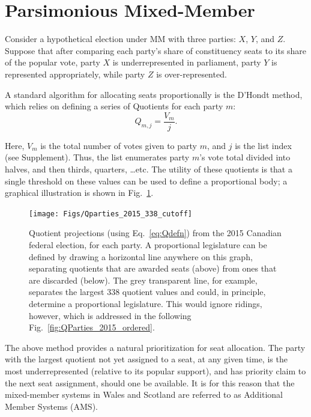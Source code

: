 \section{Parsimonious Mixed-Member}
\label{sec:model_proposal}

Consider a hypothetical election under MM with three parties: $X$, $Y$, and $Z$. Suppose that after comparing each party's share of constituency seats to its share of the popular vote, party $X$ is underrepresented in parliament, party $Y$ is represented appropriately, while party $Z$ is over-represented. 

A standard algorithm for allocating seats proportionally is the D'Hondt method, which relies on defining a series of Quotients for each party $m$:
\begin{equation}
\label{eq:Qdefn}
Q_{m,j} = \frac{V_m}{j}.
\end{equation}

Here, $V_m$ is the total number of votes given to party $m$, and $j$ is the list index (see Supplement). 
Thus, the list enumerates party $m$'s vote total divided into halves, and then thirds, quarters, \ldots etc. The utility of these quotients is that a single threshold on these values can be used to define a proportional body; a graphical illustration is shown in Fig.~\ref{fig:Qparties_2015_338_cutoff}. 


\begin{figure} %
  \texttt{[image: Figs/Qparties\_2015\_338\_cutoff]}
  \captionsetup{format=default}
  \caption{Quotient projections (using Eq.~\ref{eq:Qdefn}) from the 2015 Canadian federal election, for each party. A proportional legislature can be defined by drawing a horizontal line anywhere on this graph, separating quotients that are awarded seats (above) from ones that are discarded (below). The grey transparent line, for example, separates the largest 338 quotient values and could, in principle, determine a proportional legislature. This would ignore ridings, however, which is addressed in the following Fig.~\ref{fig:QParties_2015_ordered}. }
\label{fig:Qparties_2015_338_cutoff}
\end{figure}

The above method provides a natural prioritization for seat allocation. 
The party with the largest quotient not yet assigned to a seat, at any given time, is the most underrepresented (relative to its popular support), and has priority claim to the next seat assignment, should one be available. 
It is for this reason that the mixed-member systems in Wales and Scotland are referred to as Additional Member Systems (AMS).


